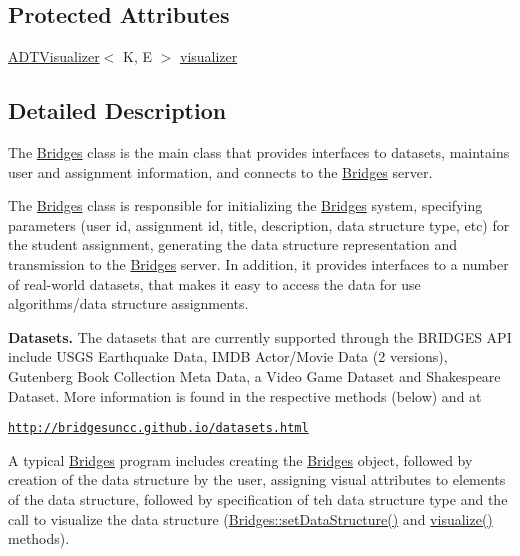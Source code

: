 \subsection*{Protected Attributes}
\begin{DoxyCompactItemize}
\item 
\hyperlink{classbridges_1_1base_1_1_a_d_t_visualizer}{A\+D\+T\+Visualizer}$<$ K, E $>$ \hyperlink{classbridges_1_1connect_1_1_bridges_af3fc35779b31c976ed8bf2e173310502}{visualizer}
\end{DoxyCompactItemize}


\subsection{Detailed Description}
The \hyperlink{classbridges_1_1connect_1_1_bridges}{Bridges} class is the main class that provides interfaces to datasets, maintains user and assignment information, and connects to the \hyperlink{classbridges_1_1connect_1_1_bridges}{Bridges} server. 

The \hyperlink{classbridges_1_1connect_1_1_bridges}{Bridges} class is responsible for initializing the \hyperlink{classbridges_1_1connect_1_1_bridges}{Bridges} system, specifying parameters (user id, assignment id, title, description, data structure type, etc) for the student assignment, generating the data structure representation and transmission to the \hyperlink{classbridges_1_1connect_1_1_bridges}{Bridges} server. In addition, it provides interfaces to a number of real-\/world datasets, that makes it easy to access the data for use algorithms/data structure assignments. ~\newline


{\bfseries Datasets.} The datasets that are currently supported through the B\+R\+I\+D\+G\+ES A\+PI include U\+S\+GS Earthquake Data, I\+M\+DB Actor/\+Movie Data (2 versions), Gutenberg Book Collection Meta Data, a Video Game Dataset and Shakespeare Dataset. More information is found in the respective methods (below) and at 

\href{http://bridgesuncc.github.io/datasets.html}{\tt http\+://bridgesuncc.\+github.\+io/datasets.\+html} 

A typical \hyperlink{classbridges_1_1connect_1_1_bridges}{Bridges} program includes creating the \hyperlink{classbridges_1_1connect_1_1_bridges}{Bridges} object, followed by creation of the data structure by the user, assigning visual attributes to elements of the data structure, followed by specification of teh data structure type and the call to visualize the data structure (\hyperlink{classbridges_1_1connect_1_1_bridges_a2cd9af150b77b8337327ea67544a0e8f}{Bridges\+::set\+Data\+Structure()} and \hyperlink{classbridges_1_1connect_1_1_bridges_a6881ed6e3f3a1db1d3cda249eb8543a1}{visualize()} methods).

